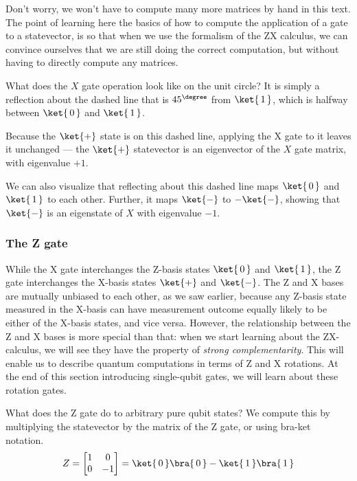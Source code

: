\documentclass{article}
\theoremstyle{definition}
\newcommand{\kz}[1]{\ket{\,#1\,}}
\newcommand{\kx}[1]{\ket{#1}}
\newcommand{\bz}[1]{\bra{\,#1\,}}
\begin{document}
Don't worry, we won't have to compute many more matrices by hand in this text.
The point of learning here the basics of how to compute the application of a gate to a statevector, is so that when we use the formalism of the ZX calculus, we can convince ourselves that we are still doing the correct computation, but without having to directly compute any matrices.

What does the $X$ gate operation look like on the unit circle?
It is simply a reflection about the dashed line that is $45^{\degree}$ from $\kz1$, which is halfway between $\kz0$ and $\kz1$.
\begin{figure}[H]
\end{figure}
Because the $\kx+$ state is on this dashed line, applying the X gate to it leaves it unchanged --- the $\kx+$ statevector is an eigenvector of the $X$ gate matrix, with eigenvalue $+1$.

We can also visualize that reflecting about this dashed line maps $\kz0$ and $\kz1$ to each other.
Further, it maps $\kx-$ to $-\kx-$, showing that $\kx-$ is an eigenstate of $X$ with eigenvalue $-1$.
\begin{figure}[H]
\end{figure}


\subsubsection{The Z gate}
While the X gate interchanges the Z-basis states $\kz0$ and $\kz1$, the Z gate interchanges the X-basis states $\kx+$ and $\kx-$.  The Z and X bases are mutually unbiased to each other, as we saw earlier, because any Z-basis state measured in the X-basis can have measurement outcome equally likely to be either of the X-basis states, and vice versa.
However, the relationship between the Z and X bases is more special than that: when we start learning about the ZX-calculus, we will see they have the property of \textit{strong complementarity}.
This will enable us to describe quantum computations in terms of Z and X rotations.  At the end of this section introducing single-qubit gates, we will learn about these rotation gates.

What does the Z gate do to arbitrary pure qubit states?
We compute this by multiplying the statevector by the matrix of the Z gate, or using bra-ket notation.
\begin{equation}
	Z = \begin{bmatrix}
		1 & 0\\
		0 & -1
	\end{bmatrix} = \kz0 \bz0 - \kz1 \bz1
\end{equation}
\end{document}
